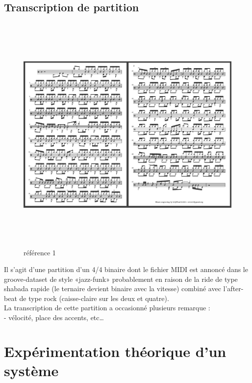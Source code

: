 \subsection*{Transcription de partition}
\begin{figure}[h]
	\includegraphics[height=120mm, width=160mm]{z_images/4_experimentations/experience_1/partition.png}
	\caption{référence 1}
\end{figure}
Il s’agit d’une partition d’un 4/4 binaire dont le fichier MIDI est annoncé dans le groove-dataset de style «jazz-funk» probablement en raison de la ride de type shabada rapide (le ternaire devient binaire avec la vitesse) combiné avec l’after-beat de type rock (caisse-claire sur les deux et quatre).\\
La transcription de cette partition a occasionné plusieurs remarque :\\
- vélocité, place des accents, etc…
\section{Expérimentation théorique d’un système}
